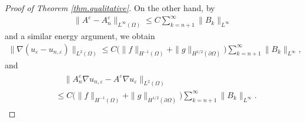 \documentclass[reqno,12pt]{amsart} %
\theoremstyle{definition}
\theoremstyle{remark}
\numberwithin{equation}{section}
\begin{document}
\begin{proof} [Proof of Theorem \ref{thm.qualitative}]
  On the other hand, by
  \begin{align*}
    \|A^\varepsilon-A_n^\varepsilon\|_{L^\infty(\Omega)}\leq C\sum_{k=n+1}^\infty\|B_k\|_{L^\infty}
  \end{align*}
  and a similar energy argument, we obtain
  \begin{align}\label{qual-homog_conver_uepsilon}
    \|\nabla (u_\varepsilon-u_{n, \varepsilon})\|_{L^2(\Omega)} \leq C\Big(\| f\|_{H^{-1}(\Omega)} + \| g\|_{H^{1/2}(\partial \Omega)} \Big) \sum_{k=n+1}^\infty\|B_k\|_{L^\infty},
  \end{align}
  and
  \begin{align}\label{est.flux.Ane-Ae}
   \begin{split}
   &\quad\|A_n^\varepsilon\nabla u_{n, \varepsilon}-A^\varepsilon\nabla u_\varepsilon\|_{L^2(\Omega)}\\&\leq  C \Big(\| f\|_{H^{-1}(\Omega)} + \| g\|_{H^{1/2}(\partial \Omega)} \Big) \sum_{k=n+1}^\infty \|B_k\|_{L^\infty}.
   \end{split}
  \end{align}


\end{proof}
\end{document}
